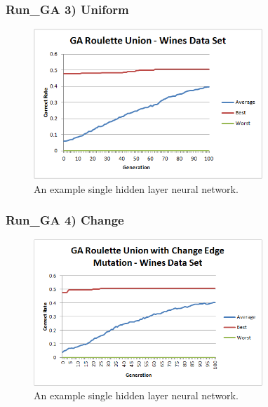 \documentclass[journal]{IEEEtran}
\begin{document}
    \subsubsection*{Run_{GA} 3) Uniform}
      \begin{figure}[here]%
        \centering
        \includegraphics[width=3.4in]{wine_uniform}
        \caption{An example single hidden layer neural network.}
        \label{fig:wine_uniform}
      \end{figure}

    \subsubsection*{Run_{GA} 4) Change}
      \begin{figure}[here]%
        \centering
        \includegraphics[width=3.4in]{wine_change_edge}
        \caption{An example single hidden layer neural network.}
        \label{fig:wine_change_edge}
      \end{figure}
\end{document}
